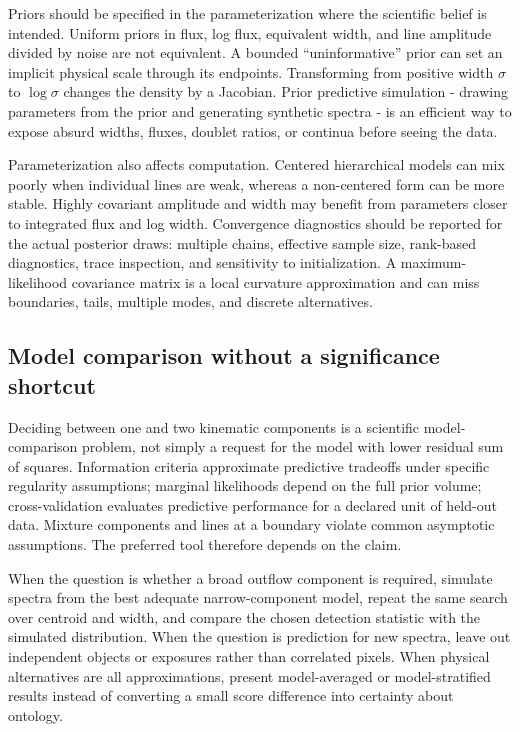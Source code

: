 Priors should be specified in the parameterization where the scientific belief
is intended.  Uniform priors in flux, log flux, equivalent width, and line
amplitude divided by noise are not equivalent.  A bounded ``uninformative''
prior can set an implicit physical scale through its endpoints.  Transforming
from positive width $\sigma$ to $\log\sigma$ changes the density by a Jacobian.
Prior predictive simulation - drawing parameters from the prior and generating
synthetic spectra - is an efficient way to expose absurd widths, fluxes,
doublet ratios, or continua before seeing the data.

Parameterization also affects computation.  Centered hierarchical models can
mix poorly when individual lines are weak, whereas a non-centered form can be
more stable.  Highly covariant amplitude and width may benefit from parameters
closer to integrated flux and log width.  Convergence diagnostics should be
reported for the actual posterior draws: multiple chains, effective sample
size, rank-based diagnostics, trace inspection, and sensitivity to initialization.
A maximum-likelihood covariance matrix is a local curvature approximation and
can miss boundaries, tails, multiple modes, and discrete alternatives.

\subsection{Model comparison without a significance shortcut}

Deciding between one and two kinematic components is a scientific model-
comparison problem, not simply a request for the model with lower residual sum
of squares.  Information criteria approximate predictive tradeoffs under
specific regularity assumptions; marginal likelihoods depend on the full prior
volume; cross-validation evaluates predictive performance for a declared unit
of held-out data.  Mixture components and lines at a boundary violate common
asymptotic assumptions.  The preferred tool therefore depends on the claim.

When the question is whether a broad outflow component is required, simulate
spectra from the best adequate narrow-component model, repeat the same search
over centroid and width, and compare the chosen detection statistic with the
simulated distribution.  When the question is prediction for new spectra,
leave out independent objects or exposures rather than correlated pixels.
When physical alternatives are all approximations, present model-averaged or
model-stratified results instead of converting a small score difference into
certainty about ontology.

